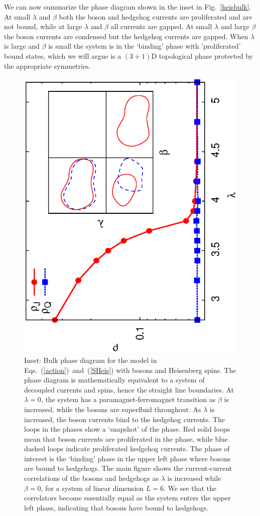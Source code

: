 \documentclass[prb,twocolumn]{revtex4-1}
\begin{document}
We can now summarize the phase diagram shown in the inset in Fig.~\ref{heisbulk}. At small $\lambda$ and $\beta$ both the boson and hedgehog currents are proliferated and are not bound, while at large $\lambda$ and $\beta$ all currents are gapped. At small $\lambda$ and large $\beta$ the boson currents are condensed but the hedgehog currents are gapped. When $\lambda$ is large and $\beta$ is small the system is in the `binding' phase with 'proliferated' bound states, which we will argue is a $(3+1)$D topological phase protected by the appropriate symmetries.


\begin{figure}
\includegraphics[angle=-90,width=\linewidth]{figures/heisbulkout.eps}
\caption{Inset: Bulk phase diagram for the model in Eqs.~(\ref{action})~and~(\ref{SHeis}) with bosons and Heisenberg spins. The phase diagram is mathematically equivalent to a system of decoupled currents and spins, hence the straight line boundaries. At $\lambda=0$, the system has a paramagnet-ferromagnet transition as $\beta$ is increased, while the bosons are superfluid throughout. As $\lambda$ is increased, the boson currents bind to the hedgehog currents. The loops in the phases show a `snapshot' of the phase. Red solid loops mean that boson currents are proliferated in the phase, while blue dashed loops indicate proliferated hedgehog currents. The phase of interest is the `binding' phase in the upper left phase where bosons are bound to hedgehogs. The main figure shows the current-current correlations of the bosons and hedgehogs as $\lambda$ is increased while $\beta=0$, for a system of linear dimension $L=6$. We see that the correlators become essentially equal as the system enters the upper left phase, indicating that bosons have bound to hedgehogs.}

\end{figure}
\end{document}
